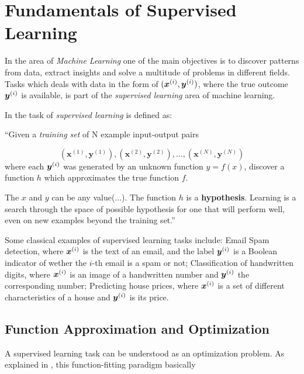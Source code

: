 \chapter{Fundamentals of Supervised Learning}
\label{cap:ml-fundamentals}

In the area of \textit{Machine Learning} one of the main objectives is to discover patterns from data, extract insights and solve a multitude of problems in different fields. Tasks which deals with data in the form of $(\bm{x}^{(i)},\bm{y}^{(i)})$, where the true outcome $\bm{y}^{(i)}$ is available, is part of the \textit{supervised learning} area of machine learning.

In \cite{aima:2010} the task of \textit{supervised learning} is defined as:

\begin{displayquote}
``Given a \textit{training set} of N example input-output pairs

$$(\bm{x}^{(1)},\bm{y}^{(1)}), (\bm{x}^{(2)},\bm{y}^{(2)}), ..., (\bm{x}^{(N)},\bm{y}^{(N)})$$
where each $\bm{y}^{(i)}$ was generated by an unknown function $y = f(x)$, discover a function $h$ which approximates the true function $f$.

The $x$ and $y$ can be any value(...). The function $h$ is a \textbf{hypothesis}. Learning is a search through the space of possible hypothesis for one that will perform well, even on new examples beyond the training set.''
\end{displayquote}

Some classical examples of supervised learning tasks include: Email Spam detection, where $\bm{x}^{(i)}$ is the text of an email, and the label $\bm{y}^{(i)}$ is a Boolean indicator of wether the $i$-th email is a spam or not; Classification of handwritten digits, where $\bm{x}^{(i)}$ is an image of a handwritten number and $\bm{y}^{(i)}$ the corresponding number; Predicting house prices, where $\bm{x}^{(i)}$ is a set of different characteristics of a house and $\bm{y}^{(i)}$ is its price.

\section{Function Approximation and Optimization}

A supervised learning task can be understood as an optimization problem. As explained in \cite{hastie2009elements}, this function-fitting paradigm basically


